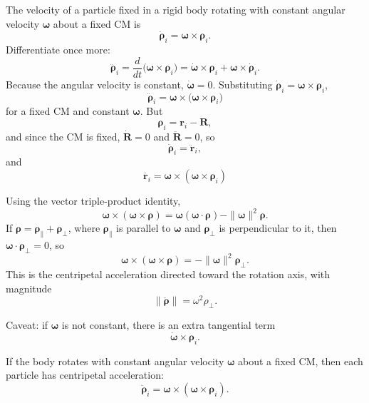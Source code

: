 \documentclass[a4paper,11pt]{article}
\begin{document}
The velocity of a particle fixed in a rigid body rotating with constant angular
velocity $\boldsymbol\omega$ about a fixed CM is
\[
\dot{\boldsymbol\rho}_i
=
\boldsymbol\omega\times\boldsymbol\rho_i .
\]
Differentiate once more:
\[
\ddot{\boldsymbol\rho}_i
=
\frac{d}{dt}\bigl(\boldsymbol\omega\times\boldsymbol\rho_i\bigr)
=
\dot{\boldsymbol\omega}\times\boldsymbol\rho_i
+
\boldsymbol\omega\times\dot{\boldsymbol\rho}_i .
\]
Because the angular velocity is constant, \(\dot{\boldsymbol\omega}=0\).
Substituting \(\dot{\boldsymbol\rho}_i=\boldsymbol\omega\times\boldsymbol\rho_i\),
\[
\ddot{\boldsymbol\rho}_i
=
\boldsymbol\omega\times
\bigl(\boldsymbol\omega\times\boldsymbol\rho_i\bigr)
\]
for a fixed CM and constant \(\boldsymbol\omega\). But
\[
\boldsymbol\rho_i=\mathbf r_i-\mathbf R,
\]
and since the CM is fixed, \(\dot{\mathbf R}=0\) and \(\ddot{\mathbf R}=0\), so
\[
\ddot{\boldsymbol\rho}_i = \ddot{\mathbf r}_i,
\]
and
\[
\ddot{\mathbf r_i}
=
\boldsymbol\omega\times
(\boldsymbol\omega\times\boldsymbol\rho_i)
\]

Using the vector triple-product identity,
\[
\boldsymbol\omega\times(\boldsymbol\omega\times\boldsymbol\rho)
=
\boldsymbol\omega(\boldsymbol\omega\cdot\boldsymbol\rho)
-
\|\boldsymbol\omega\|^2\boldsymbol\rho .
\]
If \(\boldsymbol\rho=\boldsymbol\rho_\parallel+\boldsymbol\rho_\perp\), where \(\boldsymbol\rho_\parallel\) is parallel to \(\boldsymbol\omega\) and \(\boldsymbol\rho_\perp\) is perpendicular to it, then \(\boldsymbol\omega\cdot\boldsymbol\rho_\perp=0\), so
\[
\boldsymbol\omega\times(\boldsymbol\omega\times\boldsymbol\rho)
=
-\|\boldsymbol\omega\|^2\boldsymbol\rho_\perp .
\]
This is the centripetal acceleration directed toward the rotation axis, with magnitude
\[
\|\ddot{\boldsymbol\rho}\|
=
\omega^2\rho_\perp .
\]

Caveat: if \(\boldsymbol\omega\) is not constant, there is an extra tangential term
\[
\dot{\boldsymbol\omega}\times\boldsymbol\rho_i .
\]













\hrulefill

If the body rotates with constant angular velocity $\boldsymbol\omega$
about a fixed CM, then each particle has centripetal acceleration:
\[
\ddot{\boldsymbol\rho}_i
=
\boldsymbol\omega\times(\boldsymbol\omega\times\boldsymbol\rho_i).
\]
\end{document}
